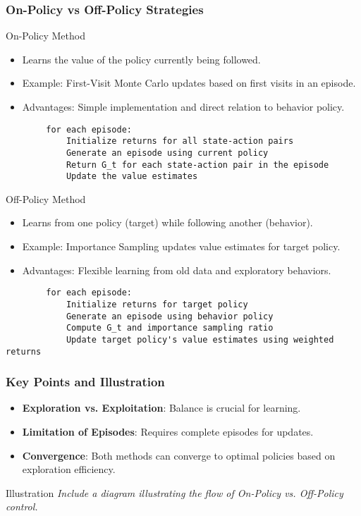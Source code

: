 \documentclass[aspectratio=169]{beamer}
\begin{document}
\begin{frame}[fragile]
    \frametitle{On-Policy vs Off-Policy Strategies}
    \begin{block}{On-Policy Method}
        \begin{itemize}
            \item Learns the value of the policy currently being followed.
            \item Example: First-Visit Monte Carlo updates based on first visits in an episode.
            \item Advantages: Simple implementation and direct relation to behavior policy.
        \end{itemize}
        \begin{lstlisting}
        for each episode:
            Initialize returns for all state-action pairs
            Generate an episode using current policy
            Return G_t for each state-action pair in the episode
            Update the value estimates
        \end{lstlisting}
    \end{block}

    \begin{block}{Off-Policy Method}
        \begin{itemize}
            \item Learns from one policy (target) while following another (behavior).
            \item Example: Importance Sampling updates value estimates for target policy.
            \item Advantages: Flexible learning from old data and exploratory behaviors.
        \end{itemize}
        \begin{lstlisting}
        for each episode:
            Initialize returns for target policy
            Generate an episode using behavior policy
            Compute G_t and importance sampling ratio
            Update target policy's value estimates using weighted returns
        \end{lstlisting}
    \end{block}
\end{frame}

\begin{frame}[fragile]
    \frametitle{Key Points and Illustration}
    \begin{itemize}
        \item \textbf{Exploration vs. Exploitation}: Balance is crucial for learning.
        \item \textbf{Limitation of Episodes}: Requires complete episodes for updates.
        \item \textbf{Convergence}: Both methods can converge to optimal policies based on exploration efficiency.
    \end{itemize}

    \begin{block}{Illustration}
        \textit{Include a diagram illustrating the flow of On-Policy vs. Off-Policy control.}
    \end{block}
\end{frame}
\end{document}

